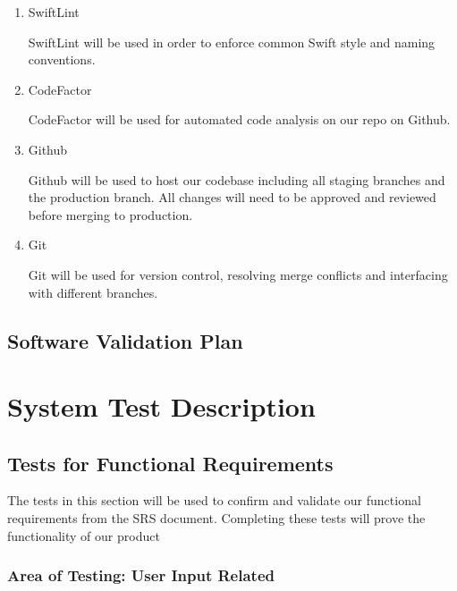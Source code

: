 \documentclass[12pt, titlepage]{article}
\begin{document}
\begin{enumerate}

\item SwiftLint

\subitem SwiftLint will be used in order to enforce common Swift style and naming conventions.

\item CodeFactor

\subitem CodeFactor will be used for automated code analysis on our repo on Github.

\item Github

\subitem Github will be used to host our codebase including all staging branches and the production branch. All changes will need to be approved and reviewed before merging to production.

\item Git

\subitem Git will be used for version control, resolving merge conflicts and interfacing with different branches.

\end{enumerate}

\subsection{Software Validation Plan}


\section{System Test Description}
	
\subsection{Tests for Functional Requirements}
\label{Section 5.1}

The tests in this section will be used to confirm and validate our functional requirements from the SRS document. Completing these tests will prove the functionality of our product

\subsubsection{Area of Testing: User Input Related}
\end{document}
